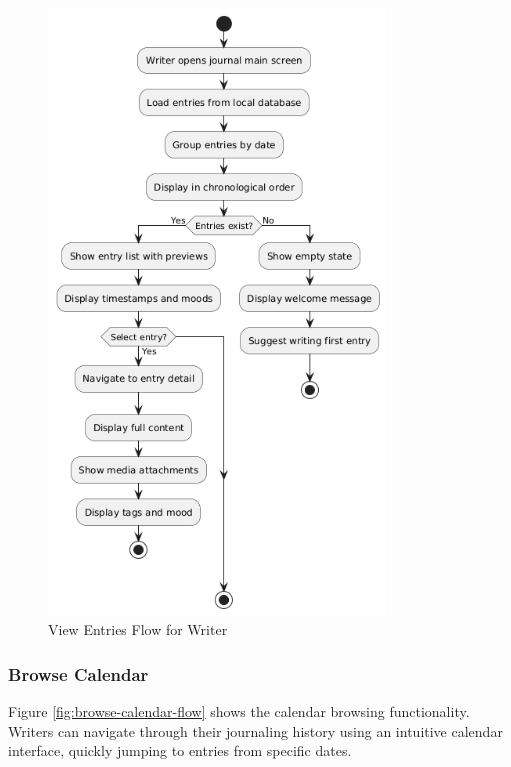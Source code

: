 \begin{figure}[H]
\centering
\includegraphics[width=0.8\textwidth]{files/imgs/view_entries_flow.png}
\caption{View Entries Flow for Writer}
\label{fig:view-entries-flow}
\end{figure}

\subsubsection{Browse Calendar}\label{subsubsec:browseCalendar}

Figure \ref{fig:browse-calendar-flow} shows the calendar browsing functionality. Writers can navigate through their journaling history using an intuitive calendar interface, quickly jumping to entries from specific dates.

